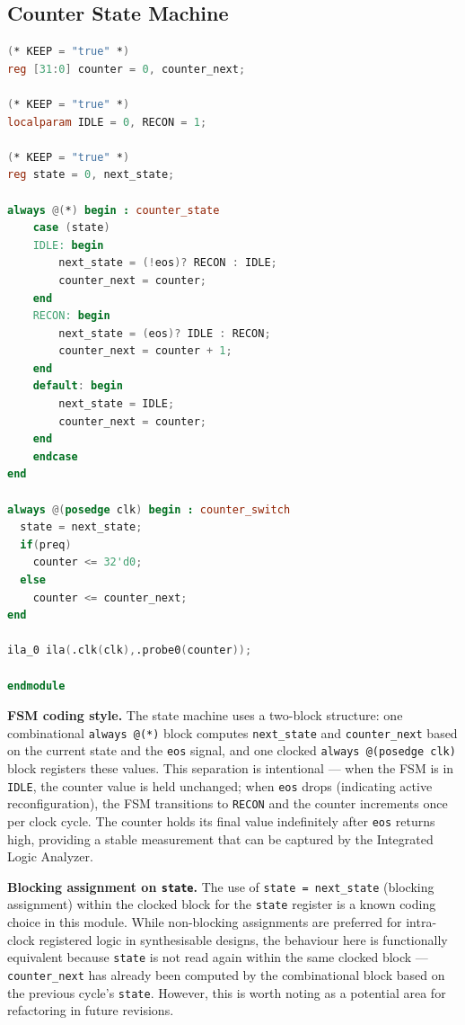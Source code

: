 \subsection{Counter State Machine}

\begin{lstlisting}[style=mystyle, language=Verilog]
(* KEEP = "true" *)
reg [31:0] counter = 0, counter_next;

(* KEEP = "true" *)
localparam IDLE = 0, RECON = 1;

(* KEEP = "true" *)
reg state = 0, next_state;

always @(*) begin : counter_state
    case (state)
    IDLE: begin
        next_state = (!eos)? RECON : IDLE;
        counter_next = counter;
    end
    RECON: begin
        next_state = (eos)? IDLE : RECON;
        counter_next = counter + 1;
    end
    default: begin
        next_state = IDLE;
        counter_next = counter;
    end
    endcase
end

always @(posedge clk) begin : counter_switch
  state = next_state;
  if(preq)
    counter <= 32'd0;
  else
    counter <= counter_next;
end

ila_0 ila(.clk(clk),.probe0(counter));

endmodule
\end{lstlisting}

\textbf{FSM coding style.} The state machine uses a two-block structure: one combinational \texttt{always @(*)} block computes \texttt{next\_state} and \texttt{counter\_next} based on the current state and the \texttt{eos} signal, and one clocked \texttt{always @(posedge clk)} block registers these values. This separation is intentional — when the FSM is in \texttt{IDLE}, the counter value is held unchanged; when \texttt{eos} drops (indicating active reconfiguration), the FSM transitions to \texttt{RECON} and the counter increments once per clock cycle. The counter holds its final value indefinitely after \texttt{eos} returns high, providing a stable measurement that can be captured by the Integrated Logic Analyzer.

\textbf{Blocking assignment on \texttt{state}.} The use of \texttt{state = next\_state} (blocking assignment) within the clocked block for the \texttt{state} register is a known coding choice in this module. While non-blocking assignments are preferred for intra-clock registered logic in synthesisable designs, the behaviour here is functionally equivalent because \texttt{state} is not read again within the same clocked block — \texttt{counter\_next} has already been computed by the combinational block based on the previous cycle's \texttt{state}. However, this is worth noting as a potential area for refactoring in future revisions.

